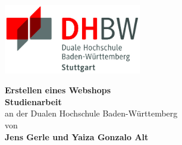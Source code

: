 \begin{titlepage}
	\thispagestyle{empty}
	\centering
	\includegraphics[width=0.45\textwidth]{bilder/dhbw_logo.jpg}
	\enlargethispage{20mm}
	\begin{center}
		\vspace*{12mm}	{\LARGE\textbf{Erstellen eines Webshops}}\\
		\vspace*{12mm}
		\vspace*{12mm}	{\large\textbf{Studienarbeit}}\\
		\vspace*{12mm}
		\vspace*{3mm}	an der Dualen Hochschule Baden-Württemberg\\
		\vspace*{12mm}	von\\
		\vspace*{3mm}	{\large\textbf{Jens Gerle und Yaiza Gonzalo Alt}}\\
	\end{center}
	\vfill
	
\end{titlepage}